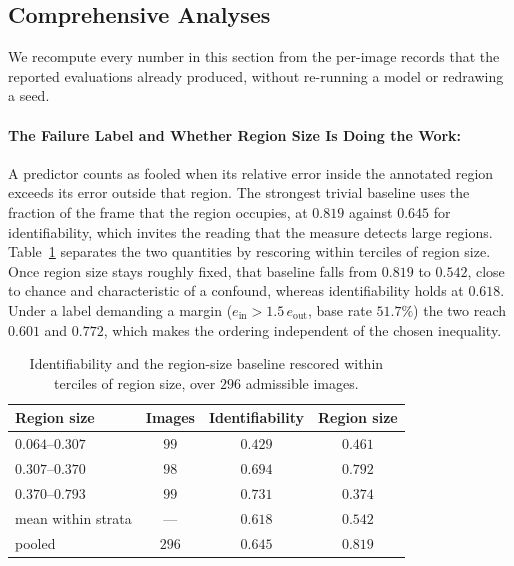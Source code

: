 \documentclass{article} %
\theoremstyle{defstyle}
\theoremstyle{plain}
\begin{document}
\subsection{Comprehensive Analyses}
\label{sec:supp-additional}

We recompute every number in this section from the per-image records that the reported
evaluations already produced, without re-running a model or redrawing a seed.

\paragraph{The Failure Label and Whether Region Size Is Doing the Work:}
A predictor counts as fooled when its relative error inside the annotated region exceeds its
error outside that region. The strongest trivial baseline uses the fraction of the frame that
the region occupies, at $0.819$ against $0.645$ for identifiability, which invites the reading
that the measure detects large regions. Table~\ref{tab:supp-strata} separates the two
quantities by rescoring within terciles of region size. Once region size stays roughly fixed,
that baseline falls from $0.819$ to $0.542$, close to chance and characteristic of a confound,
whereas identifiability holds at $0.618$. Under a label demanding a margin ($e_{\text{in}} >
1.5\,e_{\text{out}}$, base rate $51.7\%$) the two reach $0.601$ and $0.772$, which makes the
ordering independent of the chosen inequality.

\begin{table}[htb]
\caption{Identifiability and the region-size baseline rescored within terciles of region size, over $296$ admissible images.}
\label{tab:supp-strata}
\begin{center}
\footnotesize
\begin{tabular}{lccc}
\toprule
\textbf{Region size} & \textbf{Images} & \textbf{Identifiability} & \textbf{Region size} \\
\midrule
$0.064$--$0.307$ & $99$ & $0.429$ & $0.461$ \\
$0.307$--$0.370$ & $98$ & $0.694$ & $0.792$ \\
$0.370$--$0.793$ & $99$ & $0.731$ & $0.374$ \\
\midrule
mean within strata & --- & $\mathbf{0.618}$ & $0.542$ \\
pooled & $296$ & $0.645$ & $\mathbf{0.819}$ \\
\bottomrule
\end{tabular}
\end{center}
\end{table}
\end{document}
